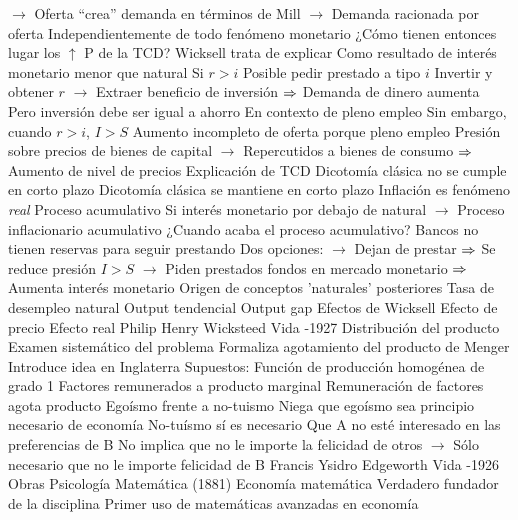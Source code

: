 \documentclass{nuevotema}
\begin{document}
\begin{esquemal}
				\4[] $\to$ Oferta ``crea'' demanda en términos de Mill
				\4[] $\to$ Demanda racionada por oferta
				\4[] Independientemente de todo fenómeno monetario
				\4[$\then$] ¿Cómo tienen entonces lugar los $\uparrow$ P de la TCD?
				\4 Wicksell trata de explicar
				\4[] Como resultado de interés monetario menor que natural
				\4 Si $r>i$
				\4[] Posible pedir prestado a tipo $i$
				\4[] Invertir y obtener $r$
				\4[] $\to$ Extraer beneficio de inversión
				\4[] $\then$ Demanda de dinero aumenta
				\4 Pero inversión debe ser igual a ahorro
				\4[] En contexto de pleno empleo
				\4 Sin embargo, cuando $r>i$, $I > S$
				\4[] Aumento incompleto de oferta porque pleno empleo
				\4[] Presión sobre precios de bienes de capital
				\4[] $\to$ Repercutidos a bienes de consumo
				\4[] $\then$ Aumento de nivel de precios
				\4[$\then$] Explicación de TCD
				\4[$\then$] Dicotomía clásica no se cumple en corto plazo
				\4[$\then$] Dicotomía clásica se mantiene en corto plazo
				\4[$\then$] Inflación es fenómeno \textit{real}
				\4 Proceso acumulativo
				\4[] Si interés monetario por debajo de natural
				\4[] $\to$ Proceso inflacionario acumulativo
				\4 ¿Cuando acaba el proceso acumulativo?
				\4[] Bancos no tienen reservas para seguir prestando
				\4[] Dos opciones:
				\4[] $\to$ Dejan de prestar
				\4[] $\then$ Se reduce presión $I>S$
				\4[] $\to$ Piden prestados fondos en mercado monetario
				\4[] $\then$ Aumenta interés monetario
				\4 Origen de conceptos 'naturales' posteriores
				\4[] Tasa de desempleo natural
				\4[] Output tendencial
				\4[] Output gap
			\3 Efectos de Wicksell
				\4 Efecto de precio
				\4 Efecto real
	\1 
		\2 Philip Henry Wicksteed
			\3 Vida
				-1927
			\3 Distribución del producto
				\4 Examen sistemático del problema
				\4 Formaliza agotamiento del producto de Menger
				\4[] Introduce idea en Inglaterra
				\4 Supuestos:
				\4[] Función de producción homogénea de grado 1
				\4[] Factores remunerados a producto marginal
				\4[$\Rightarrow$] Remuneración de factores agota producto
			\3 Egoísmo frente a no-tuismo
				\4 Niega que egoísmo sea principio necesario de economía
				\4 No-tuísmo sí es necesario
				\4[] Que A no esté interesado en las preferencias de B
				\4[] No implica que no le importe la felicidad de otros
				\4[] $\to$ Sólo necesario que no le importe felicidad de B
		\2 Francis Ysidro Edgeworth
			\3 Vida
				-1926
			\3 Obras
				\4 Psicología Matemática (1881)
			\3 Economía matemática
				\4 Verdadero fundador de la disciplina
				\4 Primer uso de matemáticas avanzadas en economía

\end{esquemal}
\end{document}
